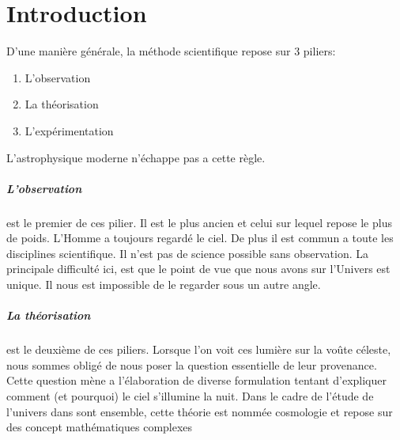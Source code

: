 \chapter{Introduction}



D'une manière générale, la méthode scientifique repose sur 3 piliers: 
\begin{enumerate}
\item L'observation
\item La théorisation
\item L'expérimentation
\end{enumerate}
L'astrophysique moderne n’échappe pas a cette règle.


\paragraph{L'observation} est le premier de ces pilier. 
Il est le plus ancien et celui sur lequel repose le plus de poids.
L'Homme a toujours regardé le ciel.
De plus il est commun a toute les disciplines scientifique.
Il n'est pas de science possible sans observation.
La principale difficulté ici, est que le point de vue que nous avons sur l'Univers est unique. 
Il nous est impossible de le regarder sous un autre angle.

\paragraph{La théorisation} est le deuxième de ces piliers.
Lorsque l'on voit ces lumière sur la voûte céleste, nous sommes obligé de nous poser la question essentielle de leur provenance.
Cette question mène a l'élaboration de diverse formulation tentant d'expliquer comment (et pourquoi) le ciel s'illumine la nuit.  
Dans le cadre de l'étude de l'univers dans sont ensemble, cette théorie est nommée cosmologie et repose sur des concept mathématiques complexes



